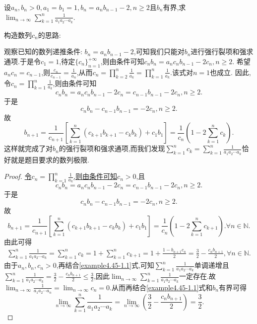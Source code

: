 \documentclass[../../main.tex]{subfiles}%
\begin{document}
\begin{example}
设\(a_n,b_n>0,a_1 = b_1 = 1,b_n=a_nb_{n - 1}-2,n\geqslant 2\)且\(b_n\)有界,求\(\lim_{n\rightarrow\infty}\sum_{k = 1}^{n}\frac{1}{a_1a_2\cdots a_k}\).
\end{example}
\begin{note}
\hypertarget{example4.45构造数列的思路}{构造数列$c_n$的思路:}观察已知的数列递推条件: \(b_n = a_nb_{n - 1} - 2\),可知我们只能对\(b_n\)进行强行裂项和强求通项.于是令\(c_1 = 1\),待定\(\{ c_n \}_{n = 1}^{+\infty}\),则由条件可知\(c_nb_n = a_nc_nb_{n - 1} - 2c_n, n\geqslant  2\).
希望\(a_nc_n = c_{n - 1}\),则\(\frac{c_n}{c_{n - 1}} = \frac{1}{a_n}\),从而\(c_n = \prod_{k = 2}^n{\frac{1}{a_k}} = \prod_{k = 1}^n{\frac{1}{a_k}}\).该式对\(n = 1\)也成立.
因此,令\(c_n = \prod_{k = 1}^n{\frac{1}{a_k}}\),则由条件可知
\[
c_nb_n = a_nc_nb_{n - 1} - 2c_n = c_{n - 1}b_{n - 1} - 2c_n, n\geqslant  2.
\]
于是
\[
c_nb_n - c_{n - 1}b_{n - 1} = -2c_n, n\geqslant  2.
\]
故
\[
b_{n + 1} = \frac{1}{c_{n + 1}}\left[ \sum_{k = 1}^n{(c_{k + 1}b_{k + 1} - c_kb_k)} + c_1b_1 \right] = \frac{1}{c_n}\left( 1 - 2\sum_{k = 1}^n{c_k} \right).
\]
这样就完成了对\(b_n\)的强行裂项和强求通项,而我们发现\(\sum_{k = 1}^n{c_k} = \sum_{k = 1}^n{\frac{1}{a_1a_2\cdots a_k}}\)恰好就是题目要求的数列极限.
\end{note}
\begin{proof}

\hyperlink{example4.45构造数列的思路}{令\(c_n = \prod_{k = 1}^n{\frac{1}{a_k}}\),则由条件可知\(c_n > 0\)},且
\[
c_nb_n = a_nc_nb_{n - 1} - 2c_n = c_{n - 1}b_{n - 1} - 2c_n, n\geqslant  2.
\]
于是
\[
c_nb_n - c_{n - 1}b_{n - 1} = -2c_n, n\geqslant  2.
\]
故
\[
b_{n + 1} = \frac{1}{c_{n + 1}}\left[ \sum_{k = 1}^n{(c_{k + 1}b_{k + 1} - c_kb_k)} + c_1b_1 \right] = \frac{1}{c_n}\left( 1 - 2\sum_{k = 1}^n{c_{k + 1}} \right). \forall n\in \mathbb{N}.
\]
由此可得
\begin{align}\label{example4.45-1.1}
\sum_{k = 1}^n{\frac{1}{a_1a_2\cdots a_k}} = \sum_{k = 1}^n{c_k} = 1 + \sum_{k = 1}^n{c_{k + 1}} = 1 + \frac{1 - b_{n + 1}c_n}{2} = \frac{3}{2} - \frac{c_nb_{n + 1}}{2}, \forall n\in \mathbb{N}.  
\end{align}
由于\(a_n, b_n, c_n > 0\),再结合\eqref{example4.45-1.1}式,可知\(\sum_{k = 1}^n{\frac{1}{a_1a_2\cdots a_k}}\)单调递增且\(\sum_{k = 1}^n{\frac{1}{a_1a_2\cdots a_k}} = \frac{3}{2} - \frac{c_nb_{n + 1}}{2} \leqslant  \frac{3}{2}\),因此\(\lim_{n\rightarrow \infty} \sum_{k = 1}^n{\frac{1}{a_1a_2\cdots a_k}}\)一定存在.故\(\lim_{n\rightarrow \infty} \frac{1}{a_1a_2\cdots a_n} = \lim_{n\rightarrow \infty} c_n = 0\).从而再结合\eqref{example4.45-1.1}式和\(b_n\)有界可得
\[
\lim_{n\rightarrow \infty} \sum_{k = 1}^n{\frac{1}{a_1a_2\cdots a_k}} = \lim_{n\rightarrow \infty} \left( \frac{3}{2} - \frac{c_nb_{n + 1}}{2} \right) = \frac{3}{2}.
\]

\end{proof}
\end{document}
